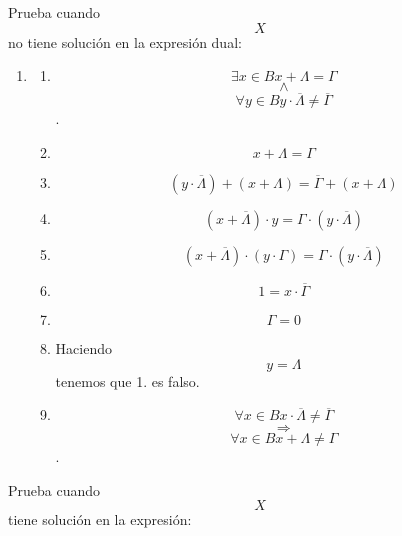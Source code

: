 \begin{enumerate}
\begin{enumerate}
\begin{enumerate}
\begin{enumerate}
\begin{enumerate}
          Prueba cuando \[X\] no tiene solución en la expresión dual:

          \begin{enumerate}
          \def\labelenumvi{\arabic{enumvi}.}
          \tightlist
          \item
            \begin{enumerate}
            \def\labelenumvii{\arabic{enumvii}.}
            \tightlist
            \item
              \[\exists{x \in B}{{x + \Lambda} = \Gamma}\]\[\land\]\[\forall{y \in B}{{y \cdot \overline{\Lambda}} \neq \overline{\Gamma}}\].
            \item
              \[{x + \Lambda} = \Gamma\]
            \item
              \[{\left( {y \cdot \overline{\Lambda}} \right) + \left( {x + \Lambda} \right)} = {\overline{\Gamma} + \left( {x + \Lambda} \right)}\]
            \item
              \[{\left( {x + \overline{\Lambda}} \right) \cdot y} = {\Gamma \cdot \left( {y \cdot \overline{\Lambda}} \right)}\]
            \item
              \[{\left( {x + \overline{\Lambda}} \right) \cdot {({y \cdot \Gamma})}} = {\Gamma \cdot \left( {y \cdot \overline{\Lambda}} \right)}\]
            \item
              \[1 = {x \cdot \overline{\Gamma}}\]
            \item
              \[\Gamma = 0\]
            \item
              Haciendo \[y = \Lambda\] tenemos que 1. es falso.
            \item
              \[\forall{x \in B}{{x \cdot \overline{\Lambda}} \neq \overline{\Gamma}}\]\[\Rightarrow\]\[\forall{x \in B}{{x + \Lambda} \neq \Gamma}\].
            \end{enumerate}
          \end{enumerate}

          Prueba cuando \[X\] tiene solución en la expresión:


\end{enumerate}
\end{enumerate}
\end{enumerate}
\end{enumerate}
\end{enumerate}
